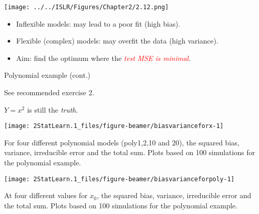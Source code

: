 \documentclass[ignorenonframetext,]{beamer}
\providecommand{\tightlist}{%
  \setlength{\itemsep}{0pt}\setlength{\parskip}{0pt}}
\begin{document}
\begin{frame}

\texttt{[image: ../../ISLR/Figures/Chapter2/2.12.png]}

\begin{itemize}
\tightlist
\item
  Inflexible models: may lead to a poor fit (high bias).
\item
  Flexible (complex) models: may overfit the data (high variance).
\item
  Aim: find the optimum where the
  \emph{\textcolor{red}{test MSE is minimal}}.
\end{itemize}

\end{frame}

\begin{frame}

\begin{block}{Polynomial example (cont.)}

See recommended exercise 2.

\vspace{2mm}

\(Y=x^2\) is still the \emph{truth}.

\vspace{2mm}

\begin{center}\texttt{[image: 2StatLearn.1\_files/figure-beamer/biasvarianceforx-1]} \end{center}

For four different polynomial models (poly1,2,10 and 20), the squared
bias, variance, irreducible error and the total sum. Plots based on 100
simulations for the polynomial example.

\end{block}

\end{frame}

\begin{frame}

\begin{center}\texttt{[image: 2StatLearn.1\_files/figure-beamer/biasvarianceforpoly-1]} \end{center}

At four different values for \(x_0\), the squared bias, variance,
irreducible error and the total sum. Plots based on 100 simulations for
the polynomial example.

\end{frame}
\end{document}
